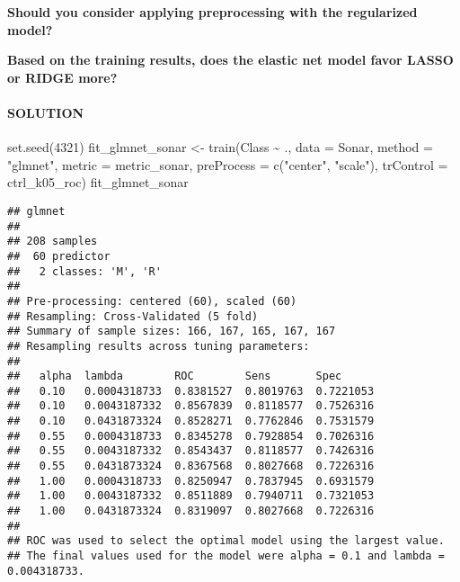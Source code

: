 \documentclass[
]{article}
\newenvironment{Shaded}{\begin{snugshade}}{\end{snugshade}}
\newcommand{\AttributeTok}[1]{\textcolor[rgb]{0.77,0.63,0.00}{#1}}
\newcommand{\DecValTok}[1]{\textcolor[rgb]{0.00,0.00,0.81}{#1}}
\newcommand{\FunctionTok}[1]{\textcolor[rgb]{0.00,0.00,0.00}{#1}}
\newcommand{\NormalTok}[1]{#1}
\newcommand{\OtherTok}[1]{\textcolor[rgb]{0.56,0.35,0.01}{#1}}
\newcommand{\SpecialCharTok}[1]{\textcolor[rgb]{0.00,0.00,0.00}{#1}}
\newcommand{\StringTok}[1]{\textcolor[rgb]{0.31,0.60,0.02}{#1}}
\begin{document}
\textbf{Should you consider applying preprocessing with the regularized
model?}

\textbf{Based on the training results, does the elastic net model favor
LASSO or RIDGE more?}

\hypertarget{solution-7}{%
\paragraph{SOLUTION}\label{solution-7}}

\begin{Shaded}
\begin{Highlighting}[]
\FunctionTok{set.seed}\NormalTok{(}\DecValTok{4321}\NormalTok{)}
\NormalTok{fit\_glmnet\_sonar }\OtherTok{\textless{}{-}} \FunctionTok{train}\NormalTok{(Class }\SpecialCharTok{\textasciitilde{}}\NormalTok{ .,}
                       \AttributeTok{data =}\NormalTok{ Sonar,}
                       \AttributeTok{method =} \StringTok{"glmnet"}\NormalTok{,}
                       \AttributeTok{metric =}\NormalTok{ metric\_sonar,}
                       \AttributeTok{preProcess =} \FunctionTok{c}\NormalTok{(}\StringTok{"center"}\NormalTok{, }\StringTok{"scale"}\NormalTok{),}
                       \AttributeTok{trControl =}\NormalTok{ ctrl\_k05\_roc)}
\NormalTok{fit\_glmnet\_sonar}
\end{Highlighting}
\end{Shaded}

\begin{verbatim}
## glmnet 
## 
## 208 samples
##  60 predictor
##   2 classes: 'M', 'R' 
## 
## Pre-processing: centered (60), scaled (60) 
## Resampling: Cross-Validated (5 fold) 
## Summary of sample sizes: 166, 167, 165, 167, 167 
## Resampling results across tuning parameters:
## 
##   alpha  lambda        ROC        Sens       Spec     
##   0.10   0.0004318733  0.8381527  0.8019763  0.7221053
##   0.10   0.0043187332  0.8567839  0.8118577  0.7526316
##   0.10   0.0431873324  0.8528271  0.7762846  0.7531579
##   0.55   0.0004318733  0.8345278  0.7928854  0.7026316
##   0.55   0.0043187332  0.8543437  0.8118577  0.7426316
##   0.55   0.0431873324  0.8367568  0.8027668  0.7226316
##   1.00   0.0004318733  0.8250947  0.7837945  0.6931579
##   1.00   0.0043187332  0.8511889  0.7940711  0.7321053
##   1.00   0.0431873324  0.8319097  0.8027668  0.7226316
## 
## ROC was used to select the optimal model using the largest value.
## The final values used for the model were alpha = 0.1 and lambda = 0.004318733.
\end{verbatim}
\end{document}
